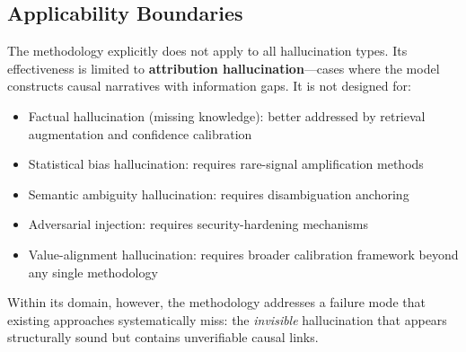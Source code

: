 \subsection{Applicability Boundaries}

The methodology explicitly does not apply to all hallucination types. Its 
effectiveness is limited to \textbf{attribution hallucination}---cases where the 
model constructs causal narratives with information gaps. It is not designed for:

\begin{itemize}
  \item Factual hallucination (missing knowledge): better addressed by retrieval 
        augmentation and confidence calibration
  \item Statistical bias hallucination: requires rare-signal amplification methods
  \item Semantic ambiguity hallucination: requires disambiguation anchoring
  \item Adversarial injection: requires security-hardening mechanisms
  \item Value-alignment hallucination: requires broader calibration framework 
        beyond any single methodology
\end{itemize}

Within its domain, however, the methodology addresses a failure mode that 
existing approaches systematically miss: the \textit{invisible} hallucination 
that appears structurally sound but contains unverifiable causal links.
